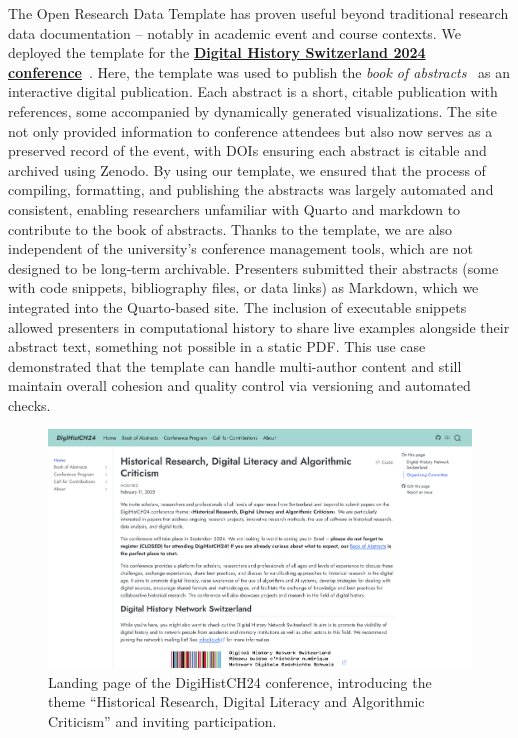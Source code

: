 \documentclass{anthology-ch}         %
\begin{document}
The Open Research Data Template has proven useful beyond traditional research data documentation -- notably in academic event and course contexts. We deployed the template for the \href{https://digihistch24.github.io/}{\textbf{Digital History Switzerland 2024 conference}}~\cite{baudry2024b}. Here, the template was used to publish the \emph{book of abstracts}~\cite{baudry2024a} as an interactive digital publication. Each abstract is a short, citable publication with references, some accompanied by dynamically generated visualizations. The site not only provided information to conference attendees but also now serves as a preserved record of the event, with DOIs ensuring each abstract is citable and archived using Zenodo. By using our template, we ensured that the process of compiling, formatting, and publishing the abstracts was largely automated and consistent, enabling researchers unfamiliar with Quarto and markdown to contribute to the book of abstracts. Thanks to the template, we are also independent of the university's conference management tools, which are not designed to be long-term archivable. Presenters submitted their abstracts (some with code snippets, bibliography files, or data links) as Markdown, which we integrated into the Quarto-based site. The inclusion of executable snippets allowed presenters in computational history to share live examples alongside their abstract text, something not possible in a static PDF. This use case demonstrated that the template can handle multi-author content and still maintain overall cohesion and quality control via versioning and automated checks.

\begin{figure}[t!]
  \centering
  \includegraphics[width=0.9\linewidth]{images/digihistch24.png}
  \caption{Landing page of the DigiHistCH24 conference, introducing the theme ``Historical Research, Digital Literacy and Algorithmic Criticism'' and inviting participation.}
  \label{fig-digihist24}
\end{figure}
\end{document}
